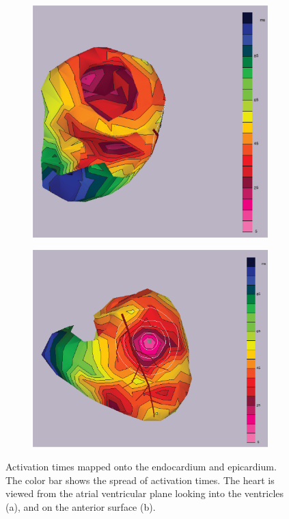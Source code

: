\documentclass[12pt]{article}
\begin{document}
\begin{figure}[H]
	\begin{subfigure}{.5\textwidth}
		\centering
		\includegraphics[width=.95\linewidth]{Figures/1_1_actTimes_1.png}
		\caption{}
		
	\end{subfigure}%
	\begin{subfigure}{.5\textwidth}
		\centering
		\includegraphics[width=.95\linewidth]{Figures/1_1_actTimes_2.png}
		\caption{}
		
	\end{subfigure}
	\caption{Activation times mapped onto the endocardium and epicardium. The color bar shows the spread of activation times. The heart is viewed from the atrial ventricular plane looking into the ventricles (a), and on the anterior surface (b).}
	\label{1_1_actTimes}
\end{figure}
\end{document}
